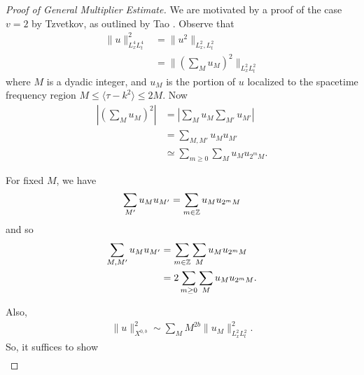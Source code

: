 \begin{proof}[Proof of General Multiplier Estimate]
  We are motivated by a proof of the case $v=2$ by Tzvetkov, as outlined by Tao \cite{Tao:2006el}. Observe that
  \begin{equation*}
  \begin{split}
    \| u \|_{L^{4}_{x}L^{4}_{t}}^{2} 
    &= \| u^{2} \|_{L^{2}_{x}, L^{2}_{t}}
    \\
    & = \| (\sum_{M}u_{M})^{2} \|_{L^{2}_{x}L^{2}_{t}}
  \end{split}
  \end{equation*}
  where $M$ is a dyadic integer, and $u_{M}$ is the portion of $u$ localized to the spacetime frequency region $M \le \langle \tau - k^{2} \rangle \le 2M$. Now 
  \begin{equation*}
  \begin{split}
    | \left( \sum_{M} u_{M} \right)^{2} |
    & = | \sum_{M} u_{M} \sum_{M'}u_{M'} |
    \\
    & = \sum_{M, M'} u_{M} u_{M'}
    \\
    & \simeq \sum_{m \ge 0} \sum_{M} u_{M}u_{2^{m}M}.
  \end{split}
  \end{equation*}
  \begin{framed}
For fixed $M$, we have
  \begin{equation*}
  \begin{split}
    \sum_{M'} u_{M} u_{M'} = \sum_{m \in \mathbb{Z}} u_{M} u_{2^{m}M}
  \end{split}
  \end{equation*}
  and so
  \begin{equation*}
  \begin{split}
    \sum_{M, M'} u_{M}u_{M'}
    & = \sum_{m \in \mathbb{Z}} \sum_{M} u_{M} u_{2^{m}M}
    \\
    & = 2 \sum_{m \ge 0} \sum_{M} u_{M}u_{2^{m}M}.
  \end{split}
  \end{equation*}
\end{framed}
  Also,
  \begin{equation*}
  \begin{split}
    \| u \|^{2}_{X^{0, b}} \sim \sum_{M} M^{2b} \| u_{M} \|^{2}_{L^{2}_{x}L^{2}_{t}}.
  \end{split}
  \end{equation*}
  So, it suffices to show
%
%
\begin{equation*}
\begin{split}

\end{split}
\end{equation*}
\end{proof}
